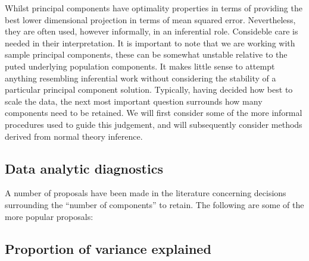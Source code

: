 Whilst principal components have optimality properties in terms of providing the best lower dimensional projection in terms of mean squared error.   Nevertheless, they are often used, however informally, in an inferential role.   Consideble care is needed in their interpretation.   It is important to note that we are working with sample principal components, these can be somewhat unstable relative to the puted underlying population components.   It makes little sense to attempt anything resembling inferential work without considering the stability of a particular principal component solution.   Typically, having decided how best to scale the data, the next most important question surrounds how many components need to be retained.   We will first consider some of the more informal procedures used to guide this judgement, and will subsequently consider methods derived from normal theory inference.



\subsection{Data analytic diagnostics}

A number of proposals have been made in the literature concerning decisions surrounding the ``number of components'' to retain.  The following are some of the more popular proposals:



\subsection{Proportion of variance explained}
\label{propexpl}

